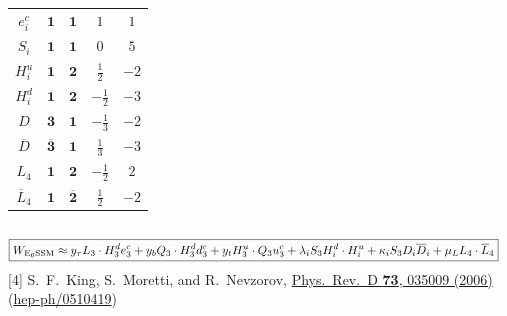 \documentclass[10pt,aspectratio=169]{beamer}
\begin{document}
\begin{frame}
\begin{columns}[t]
\begin{column}{0.5\textwidth}
\begin{table}[h]
\begin{tabular}{ccccc}
            $e_i^c$ & $\mathbf{1}$ & $\mathbf{1}$ & $1$ & $1$ \\
            $S_i$ & $\mathbf{1}$ & $\mathbf{1}$ & $0$ & $5$ \\
            $H_i^u$ & $\mathbf{1}$ & $\mathbf{2}$ & $\frac{1}{2}$
            & $-2$ \\
            $H_i^d$ & $\mathbf{1}$ & $\mathbf{2}$ & $-\frac{1}{2}$
            & $-3$ \\
            $D$ & $\mathbf{3}$ & $\mathbf{1}$ & $-\frac{1}{3}$ & $-2$ \\
            $\overline{D}$ & $\mathbf{\overline{3}}$ &  $\mathbf{1}$
            & $\frac{1}{3}$ & $-3$ \\
            $L_4$ & $\mathbf{1}$ & $\mathbf{2}$ & $-\frac{1}{2}$ & $2$ \\
            $\overline{L}_4$ & $\mathbf{1}$ & $\mathbf{\overline{2}}$
            & $\frac{1}{2}$ & $-2$ \\
            \bottomrule
          \end{tabular}
        \end{table}
      \end{column}
    \end{columns}
    \vspace{-4pt}
    \begin{align*}
      \Aboxed{W_{\text{E}_6\text{SSM}} \approx y_{\tau} L_3 \cdot
        H^d_3 e^c_3 + y_b Q_3 \cdot H^d_3 d_3^c
        + y_t H^u_3 \cdot Q_3 u_3^c + \lambda_i S_3
        H_i^d \cdot H_i^u  + \kappa_i S_3 D_i
        \overline{D}_i + \mu_L L_4 \cdot \overline{L}_4}
    \end{align*}
        {\tiny [4] S.~F.~King, S.~Moretti, and R.~Nevzorov,
          \href{http://dx.doi.org/10.1103/PhysRevD.73.035009}{Phys.~Rev.~D
            \textbf{73}, 035009 (2006)}
          (\href{http://arxiv.org/abs/hep-ph/0510419}{hep-ph/0510419})}
\end{frame}
\end{document}
